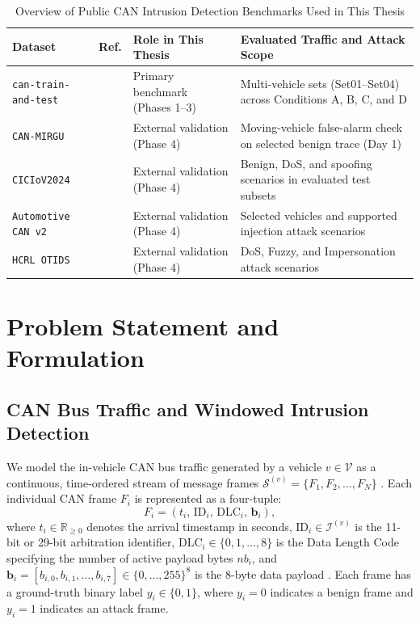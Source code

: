 \documentclass[12pt, a4paper, reqno, oneside]{book}
\begin{document}
\begin{table}[htbp]
\caption{Overview of Public CAN Intrusion Detection Benchmarks Used in This Thesis}
\label{tab:datasets_overview}
\centering
\renewcommand{\arraystretch}{1.25}
\small
\begin{tabularx}{\textwidth}{p{2.7cm} c p{3.7cm} X}
\hline
\textbf{Dataset} & \textbf{Ref.} & \textbf{Role in This Thesis} & \textbf{Evaluated Traffic and Attack Scope} \\
\hline
\texttt{can-train-and-test} & \cite{lampe2023cantrain, lampe2024curated} & Primary benchmark (Phases 1--3) & Multi-vehicle sets (Set01--Set04) across Conditions A, B, C, and D \\
\texttt{CAN-MIRGU} & \cite{rajapaksha2024canmirgu} & External validation (Phase 4) & Moving-vehicle false-alarm check on selected benign trace (Day 1) \\
\texttt{CICIoV2024} & \cite{neto2024ciciov2024} & External validation (Phase 4) & Benign, DoS, and spoofing scenarios in evaluated test subsets \\
\texttt{Automotive CAN v2} & \cite{dupont2019automotive} & External validation (Phase 4) & Selected vehicles and supported injection attack scenarios \\
\texttt{HCRL OTIDS} & \cite{lee2017otids} & External validation (Phase 4) & DoS, Fuzzy, and Impersonation attack scenarios \\
\hline
\end{tabularx}
\end{table}

\section{Problem Statement and Formulation}
\label{subsec:problem_formulation}

\subsection{CAN Bus Traffic and Windowed Intrusion Detection}
We model the in-vehicle CAN bus traffic generated by a vehicle $v \in \mathcal{V}$ as a continuous, time-ordered stream of message frames $\mathcal{S}^{(v)} = \{F_1, F_2, \dots, F_N\}$ \cite{song2020invehicle, lee2017otids}. Each individual CAN frame $F_i$ is represented as a four-tuple:
\begin{equation}
    F_i = \left( t_i,\, \text{ID}_i,\, \text{DLC}_i,\, \mathbf{b}_i \right),
\end{equation}
where $t_i \in \mathbb{R}_{\ge 0}$ denotes the arrival timestamp in seconds, $\text{ID}_i \in \mathcal{I}^{(v)}$ is the 11-bit or 29-bit arbitration identifier, $\text{DLC}_i \in \{0, 1, \dots, 8\}$ is the Data Length Code specifying the number of active payload bytes $nb_i$, and $\mathbf{b}_i = [b_{i,0}, b_{i,1}, \dots, b_{i,7}] \in \{0, \dots, 255\}^8$ is the 8-byte data payload \cite{lampe2024curated}. Each frame has a ground-truth binary label $y_i \in \{0, 1\}$, where $y_i = 0$ indicates a benign frame and $y_i = 1$ indicates an attack frame.
\end{document}
